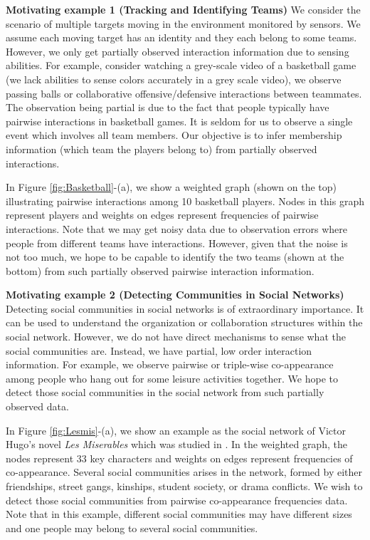 \documentclass{article}
\begin{document}
\textbf{Motivating example 1 (Tracking and Identifying Teams)}
We consider the scenario of multiple targets moving in the environment monitored by sensors. 
We assume each moving target has an identity and 
they each belong to some teams.
However, we only get partially observed interaction information due
to sensing abilities. 
For example, consider watching a grey-scale video of a basketball 
game (we lack abilities to sense colors accurately in a grey scale video), we observe 
passing balls or collaborative offensive/defensive interactions
between teammates. The observation being partial is due to the fact that
people typically have pairwise interactions in basketball games.
It is seldom for us to observe a 
single event which involves all team members. 
Our objective is to infer membership information (which team the players belong to)
from partially observed interactions.

In Figure \ref{fig:Basketball}-(a), we show a weighted graph (shown on the top)
illustrating pairwise interactions among 10 basketball players. Nodes in this
graph represent players and weights on edges represent frequencies of pairwise interactions. Note that
we may get noisy data due to observation errors where people from different teams have interactions. However, given that the noise is not too much, we hope to be capable to identify the two teams 
(shown at the bottom) from such partially observed pairwise interaction information. 

\textbf{Motivating example 2 (Detecting Communities in Social Networks)}
Detecting social communities in social networks is of extraordinary importance.
It can be used to understand the organization or collaboration structures within the social network. However, we do not have direct mechanisms to sense what the social communities are. Instead, we have partial, low order interaction information. For example, we observe pairwise or triple-wise co-appearance among people who hang out for some leisure activities together. We hope to detect those social communities in the social network from such partially observed data. 

In Figure \ref{fig:Lesmis}-(a), we show an example as the social network of Victor Hugo's novel {\sl Les Miserables} which was studied in \cite{Knuth93}. In the weighted graph, the nodes represent $33$ key characters and weights on edges represent frequencies of co-appearance. Several social communities arises in the network, formed by either friendships, street gangs, kinships, student society, or drama conflicts. We wish to detect those social communities from pairwise co-appearance frequencies data. Note that in this example, different social communities may have different sizes 
and one people may belong to several social communities.
\end{document}
